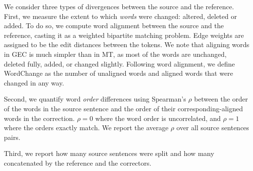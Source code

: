 \documentclass[a4paper, 11pt]{article}
\begin{document}
We consider three types of divergences between the source and the reference.
First, we measure the extent to which \emph{words} were changed: altered, deleted or added.
To do so, we compute word alignment between the source and the reference, casting it
as a weighted bipartite matching problem. Edge weights are assigned to be the edit distances between the tokens.
We note that aligning words in GEC is much simpler than in MT,
as most of the words are unchanged, deleted fully, added, or changed slightly.
Following word alignment, we define {\sc WordChange}
as the number of unaligned words and aligned words that were changed in any way.

Second, we quantify word \emph{order} differences using
Spearman's $\rho$ between the order of the words in the source sentence
and the order of their corresponding-aligned words in the correction.
$\rho=0$ where the word order is uncorrelated, and $\rho=1$ where the orders exactly match. We report the average $\rho$ over all source sentences pairs. 

Third, we report how many source sentences were split and how many concatenated by the reference and the correctors.
\end{document}
